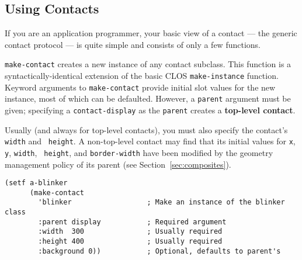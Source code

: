 \subsection{Using Contacts}
If you are an application programmer, your basic view of a contact --- the generic
contact protocol --- is quite simple and consists of only a few functions.

{\tt make-contact} 
creates a new instance of any con\-tact subclass. This function is a
syn\-tac\-ti\-cal\-ly-identical extension of the basic CLOS {\tt make-instance}
function. Keyword arguments to  {\tt make-contact}  provide initial slot values
for the new instance, most of which can be defaulted. However, a {\tt parent}
argument must be given; specifying a {\tt contact-display} as the {\tt parent}
creates a {\bf top-level contact}. 

\begin{center}
 \end{center}


Usually (and always
for top-level contacts), you must also specify the contact's {\tt width} and {\tt
height}. A non-top-level contact may find that its initial values for 
{\tt x}, {\tt y}, {\tt width}, {\tt
height}, and {\tt border-width} have been modified by the geometry management
policy of its parent (see Section~\ref{sec:composites}).

\begin{verbatim}
(setf a-blinker
      (make-contact
        'blinker                  ; Make an instance of the blinker class
        :parent display           ; Required argument
        :width  300               ; Usually required
        :height 400               ; Usually required
        :background 0))           ; Optional, defaults to parent's
\end{verbatim}



